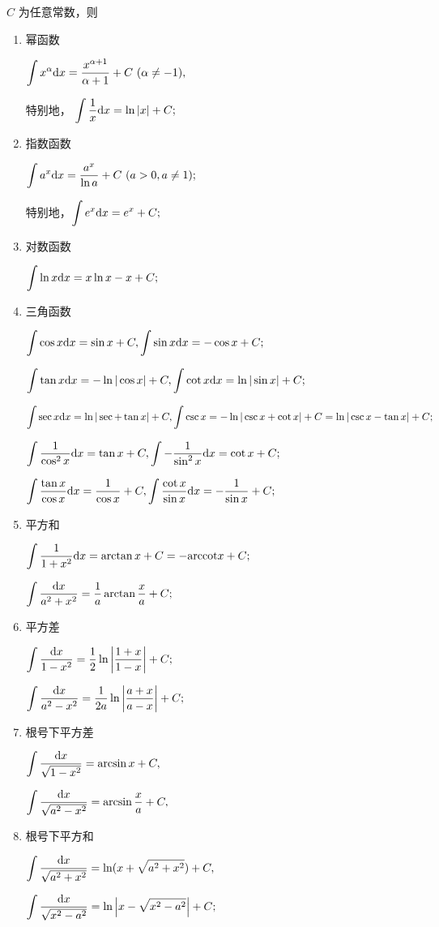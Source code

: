 $ C $ 为任意常数，则
\begin{enumerate}
    \item 幂函数
    
    $\displaystyle \int x^\alpha \mathrm{d}x = \frac{x^{\alpha +1}}{\alpha + 1} + C\ (\alpha \neq -1), $
    
    特别地， $\displaystyle \int \frac{1}{x} \mathrm{d}x = \ln|x| + C; $ 
    \item 指数函数
    
    $\displaystyle \int a^x \mathrm{d}x = \frac{a^x}{\ln a} + C\ (a>0,a\neq 1) ; $
    
    特别地，$\displaystyle \int e^x\mathrm{d}x = e^x+C ; $
    \item 对数函数
    
    $ \displaystyle \int\ln x\mathrm{d}x = x \ln x - x + C; $ 
    \item 三角函数
    
    $ \displaystyle \int \cos x \mathrm{d}x = \sin x + C, \displaystyle \int \sin x \mathrm{d}x = -\cos x + C ; $

    $ \displaystyle \int \tan x\mathrm{d}x = -\ln|\cos x| + C,\int \cot x \mathrm{d}x = \ln|\sin x| + C; $ 

    $ \displaystyle \int \sec x\mathrm{d}x = \ln|\sec + \tan x| + C,\int \csc x= -\ln|\csc x + \cot x| + C
    = \ln|\csc x - \tan x| + C; $ 

    $\displaystyle \int \frac{1}{\cos^2 x}\mathrm{d}x = \tan x + C, \displaystyle \int -\frac{1}{\sin^2 x}\mathrm{d}x = \cot x + C ; $

    $\displaystyle \int \frac{\tan x}{\cos x} \mathrm{d}x = \frac{1}{\cos x} + C, 
    \displaystyle \int \frac{\cot x}{\sin x}\mathrm{d}x = -\frac{1}{\sin x} + C ; $
    \item 平方和
    
    $\displaystyle \int \frac{1}{1+x^2}\mathrm{d}x = \arctan x + C = -\textrm{arccot} x + C; $

    $ \displaystyle \int \dfrac{\mathrm{d}x}{a^2 + x^2} = \dfrac{1}{a}\arctan \dfrac{x}{a} + C; $    
    \item 平方差
    
    $ \displaystyle \int \dfrac{\mathrm{d}x}{1-x^2} = \dfrac{1}{2}\ln\left|\dfrac{1+x}{1-x}\right| + C; $ 

    $ \displaystyle \int \dfrac{\mathrm{d}x}{a^2-x^2} = \dfrac{1}{2a}\ln\left|\dfrac{a+x}{a-x}\right| + C; $ 
    
    \item 根号下平方差
    
    $ \displaystyle \int \dfrac{\mathrm{d}x}{\sqrt{1-x^2}} = \arcsin x + C,$

    $ \displaystyle \int \dfrac{\mathrm{d}x}{\sqrt{a^2-x^2}} = \arcsin \dfrac{x}{a} + C,$
    \item 根号下平方和
    
    $ \displaystyle \int \dfrac{\mathrm{d}x}{\sqrt{a^2+x^2}} = \ln(x + \sqrt{a^2+x^2}) + C,$

    $ \displaystyle \int \dfrac{\mathrm{d}x}{\sqrt{x^2 - a^2}} = \ln\left|x - \sqrt{x^2-a^2}\right| + C;$
\end{enumerate}    



